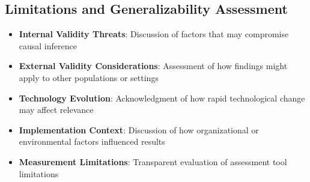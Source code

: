 \subsection{Limitations and Generalizability Assessment}
\begin{itemize}
    \item \textbf{Internal Validity Threats}: Discussion of factors that may compromise causal inference
    
    \item \textbf{External Validity Considerations}: Assessment of how findings might apply to other populations or settings
    
    \item \textbf{Technology Evolution}: Acknowledgment of how rapid technological change may affect relevance
    
    \item \textbf{Implementation Context}: Discussion of how organizational or environmental factors influenced results
    
    \item \textbf{Measurement Limitations}: Transparent evaluation of assessment tool limitations
\end{itemize}